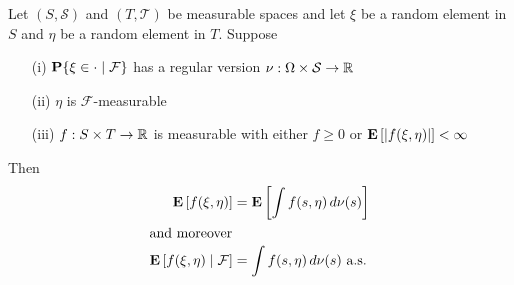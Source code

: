 \begin{thm}\label{Disintegration}Let $(S, \mathcal{S})$ and $(T, \mathcal{T})$ be measurable
  spaces and let $\xi$ be a random element in $S$ and $\eta$ be a
  random element in $T$.  Suppose 
\begin{itemize}
\item[(i)] $\cprobability{\mathcal{F}}{\xi \in
    \cdot}$ has a regular version $\nu : \Omega \times \mathcal{S} \to
  \reals$ 
\item[(ii)] $\eta$ is  $\mathcal{F}$-measurable 
\item[(iii)] $f : S \times T \to \reals$ is
  measurable with either $f \geq 0$ or $\expectation{\abs{f(\xi,
      \eta)}}< \infty$
\end{itemize}
Then 
\begin{align*}
\expectation{f(\xi, \eta)} &= \expectation{\int f(s, \eta) \, d\nu(s)}\\
\intertext{and moreover}
\cexpectationlong{\mathcal{F}}{f(\xi, \eta)} &= \int f(s, \eta) \, d\nu(s)
\text{ a.s.} \\
\end{align*}
\end{thm}
